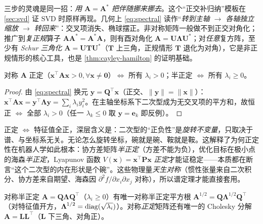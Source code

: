 \noindent 三步的灵魂是同一招：\emph{用 $\mathbf{A}=\mathbf{A}^*$ 把伴随挪来挪去}。这个“正交补归纳”模板在 \cref{sec:svd} 证 SVD 时原样再现。几何上 \cref{eq:spectral} 读作“\emph{转到主轴 $\to$ 各轴独立缩放 $\to$ 转回来}”：交叉项消失、椭球摆正。非对称矩阵一般做不到正交对角化；推广到\emph{复正规}算子 $\mathbf{A}\mathbf{A}^*=\mathbf{A}^*\mathbf{A}$，则有酉对角化 $\mathbf{A}=\mathbf{U}\boldsymbol{\Lambda}\mathbf{U}^*$；对\emph{任意}复方阵，至少有 \emph{Schur 三角化} $\mathbf{A}=\mathbf{U}\mathbf{T}\mathbf{U}^*$（$\mathbf{T}$ 上三角，正规情形 $\mathbf{T}$ 退化为对角），它是非正规情形的核心工具，也是 \cref{thm:cayley-hamilton} 的证明基础。

\begin{theorem}[正定性的特征值判据]\label{thm:positive-definite}
对称 $\mathbf{A}$ 正定（$\mathbf{x}^\top\mathbf{A}\mathbf{x}>0,\forall\mathbf{x}\neq\mathbf{0}$）$\iff$ 所有 $\lambda_i>0$；半正定 $\iff$ 所有 $\lambda_i\ge0$。
\end{theorem}
\begin{proof}
由 \cref{eq:spectral} 换元 $\mathbf{y}=\mathbf{Q}^\top\mathbf{x}$（正交、$\|\mathbf{y}\|=\|\mathbf{x}\|$）：$\mathbf{x}^\top\mathbf{A}\mathbf{x}=\mathbf{y}^\top\boldsymbol{\Lambda}\mathbf{y}=\sum_i\lambda_iy_i^2$。在主轴坐标系下二次型成为无交叉项的平方和，故恒正 $\iff$ 全部 $\lambda_i>0$（任一 $\lambda_k\le0$ 取 $\mathbf{y}=\mathbf{e}_k$ 即反例）。
\end{proof}

\begin{insight}[正定 = “这个二次型的内在形状是个碗”，与坐标无关]
正定 $\iff$ 特征值全正，深层含义是：二次型的“正负性”是\emph{旋转不变量}，只取决于谱、与坐标系无关。无论怎么旋转坐标，碗就是碗、鞍就是鞍。这解释了为何正定性在机器人学如此根本：协方差矩阵\emph{半正定}（方差不能为负），优化目标在极小点的海森\emph{半正定}，Lyapunov 函数 $V(\mathbf{x})=\mathbf{x}^\top\mathbf{P}\mathbf{x}$ \emph{正定}才能证稳定——本质都在断言“这个二次型的内在形状是个碗”。这些物理量\emph{天生对称}（惯性张量来自二次积分、协方差来自期望、海森因 $\partial^2 f/\partial x_i\partial x_j$ 对称），所以谱定理才能直接套用。
\end{insight}

\begin{corollary}\label{cor:sqrt}
对称半正定 $\mathbf{A}=\mathbf{Q}\boldsymbol{\Lambda}\mathbf{Q}^\top$（$\lambda_i\ge0$）有唯一对称半正定平方根 $\mathbf{A}^{1/2}=\mathbf{Q}\boldsymbol{\Lambda}^{1/2}\mathbf{Q}^\top$（对特征值开方，$\boldsymbol{\Lambda}^{1/2}=\operatorname{diag}(\sqrt{\lambda_i})$）。对称\emph{正定}矩阵还有唯一的 Cholesky 分解 $\mathbf{A}=\mathbf{L}\mathbf{L}^\top$（$\mathbf{L}$ 下三角、对角正）。
\end{corollary}

